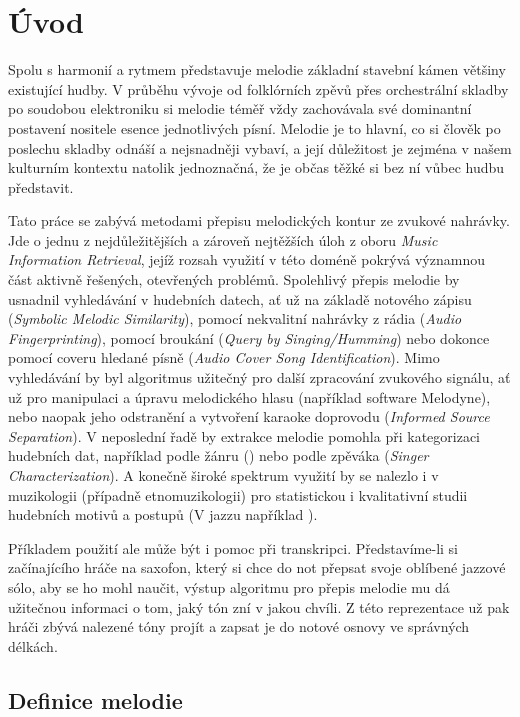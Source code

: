 \chapter*{Úvod}

Spolu s harmonií a rytmem představuje melodie základní stavební kámen většiny existující hudby. V průběhu vývoje od folklórních zpěvů přes orchestrální skladby po soudobou elektroniku si melodie téměř vždy zachovávala své dominantní postavení nositele esence jednotlivých písní. Melodie je to hlavní, co si člověk po poslechu skladby odnáší a nejsnadněji vybaví, a její důležitost je zejména v našem kulturním kontextu natolik jednoznačná, že je občas těžké si bez ní vůbec hudbu představit. 

Tato práce se zabývá metodami přepisu melodických kontur ze zvukové nahrávky. Jde o jednu z nejdůležitějších a zároveň nejtěžších úloh z oboru \textit{Music Information Retrieval}, jejíž rozsah využití v této doméně pokrývá významnou část aktivně řešených, otevřených problémů. Spolehlivý přepis melodie by usnadnil vyhledávání v hudebních datech, ať už na základě notového zápisu (\textit{Symbolic Melodic Similarity}), pomocí nekvalitní nahrávky z rádia (\textit{Audio Fingerprinting}), pomocí broukání (\textit{Query by Singing/Humming}) nebo dokonce pomocí coveru hledané písně (\textit{Audio Cover Song Identification}). Mimo vyhledávání by byl algoritmus užitečný pro další zpracování zvukového signálu, ať už pro manipulaci a úpravu melodického hlasu (například software Melodyne), nebo naopak jeho odstranění a vytvoření karaoke doprovodu (\textit{Informed Source Separation}). V neposlední řadě by extrakce melodie pomohla při kategorizaci hudebních dat, například podle žánru (\cite{Salamon2012}) nebo podle zpěváka (\textit{Singer Characterization}). A konečně široké spektrum využití by se nalezlo i v muzikologii (případně etnomuzikologii) pro statistickou i kvalitativní studii hudebních motivů a postupů (V jazzu například \cite{Pfleiderer}).

Příkladem použití ale může být i pomoc při transkripci. Představíme-li si začínajícího hráče na saxofon, který si chce do not přepsat svoje oblíbené jazzové sólo, aby se ho mohl naučit, výstup algoritmu pro přepis melodie mu dá užitečnou informaci o tom, jaký tón zní v jakou chvíli. Z této reprezentace už pak hráči zbývá nalezené tóny projít a zapsat je do notové osnovy ve správných délkách.


\section{Definice melodie}


